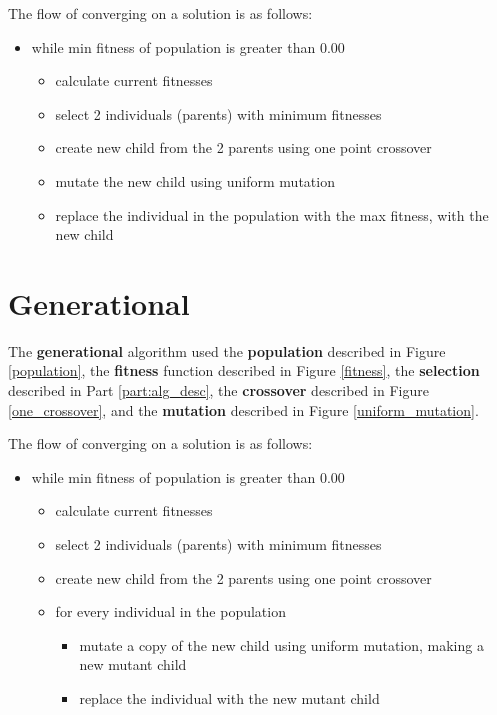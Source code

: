 \documentclass[12pt]{article}
\begin{document}
The flow of converging on a solution is as follows:
\begin{itemize}
	\item while min fitness of population is greater than 0.00
	\begin{itemize}
		\item calculate current fitnesses
		\item select 2 individuals (parents) with minimum fitnesses
		\item create new child from the 2 parents using one point crossover
		\item mutate the new child using uniform mutation
		\item replace the individual in the population with the max fitness, with the new child
	\end{itemize}
\end{itemize}


\section{Generational}
\label{sec:gen}
The \textbf{generational} algorithm used the \textbf{population} described in Figure \ref{population}, the \textbf{fitness} function described in Figure \ref{fitness}, the \textbf{selection} described in Part \ref{part:alg_desc}, the \textbf{crossover} described in Figure \ref{one_crossover}, and the \textbf{mutation} described in Figure \ref{uniform_mutation}.

The flow of converging on a solution is as follows:
\begin{itemize}
	\item while min fitness of population is greater than 0.00
	\begin{itemize}
		\item calculate current fitnesses
		\item select 2 individuals (parents) with minimum fitnesses
		\item create new child from the 2 parents using one point crossover
		\item for every individual in the population
			\begin{itemize}
				\item mutate a copy of the new child using uniform mutation, making a new mutant child
				\item replace the individual with the new mutant child
			\end{itemize}
	\end{itemize}
\end{itemize}
\end{document}
